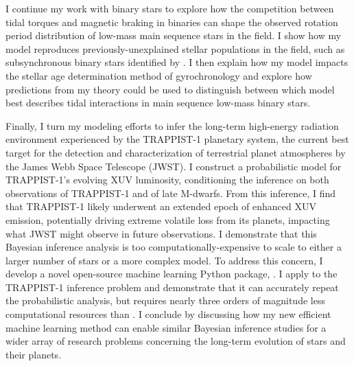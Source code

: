 {I continue my work with binary stars to explore how the competition between tidal torques and magnetic braking in binaries can shape the observed rotation period distribution of low-mass main sequence stars in the \kepler field. I show how my model reproduces previously-unexplained stellar populations in the \kepler field, such as subsynchronous binary stars identified by \citet{Lurie2017}. I then explain how my model impacts the stellar age determination method of gyrochronology and explore how predictions from my theory could be used to distinguish between which model best describes tidal interactions in main sequence low-mass binary stars.

Finally, I turn my modeling efforts to infer the long-term high-energy radiation environment experienced by the TRAPPIST-1 planetary system, the current best target for the detection and characterization of terrestrial planet atmospheres by the James Webb Space Telescope (JWST). I construct a probabilistic model for TRAPPIST-1's evolving XUV luminosity, conditioning the inference on both observations of TRAPPIST-1 and of late M-dwarfs. From this inference, I find that TRAPPIST-1 likely underwent an extended epoch of enhanced XUV emission, potentially driving extreme volatile loss from its planets, impacting what JWST might observe in future observations. I demonstrate that this Bayesian inference analysis is too computationally-expensive to scale to either a larger number of stars or a more complex model. To address this concern, I develop a novel open-source machine learning Python package, \approxposterior. I apply \approxposterior to the TRAPPIST-1 inference problem and demonstrate that it can accurately repeat the probabilistic analysis, but requires nearly three orders of magnitude less computational resources than \emcee. I conclude by discussing how my new efficient machine learning method can enable similar Bayesian inference studies for a wider array of research problems concerning the long-term evolution of stars and their planets.

}
